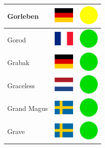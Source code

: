 \documentclass[12pt, a4paper, twoside]{report}
\begin{document}
\begin{center}
\begin{longtable}{|p{5cm}|p{2cm}|p{2cm}|}
 Gorleben                                                   & \includegraphics[width=1cm]{../4x3/de} &   \includegraphics[width=1cm]{../likes/m} \\ \hline
 Gorod                                                      & \includegraphics[width=1cm]{../4x3/fr} &   \includegraphics[width=1cm]{../likes/y} \\ \hline
 Grabak                                                     & \includegraphics[width=1cm]{../4x3/de} &   \includegraphics[width=1cm]{../likes/y} \\ \hline
 Graceless                                                  & \includegraphics[width=1cm]{../4x3/nl} &   \includegraphics[width=1cm]{../likes/y} \\ \hline
 Grand Magus                                                & \includegraphics[width=1cm]{../4x3/se} &   \includegraphics[width=1cm]{../likes/y} \\ \hline
 Grave                                                      & \includegraphics[width=1cm]{../4x3/se} &   \includegraphics[width=1cm]{../likes/y} \\ \hline

\end{longtable}
\end{center}
\end{document}
